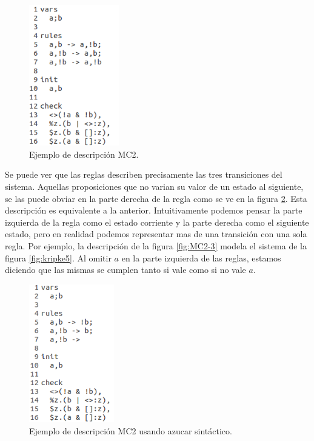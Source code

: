 \begin{figure}[H]
  \centering
  \includegraphics[width=0.35\textwidth]{Figures/modeloMC2-1.png}
  \caption{Ejemplo de descripción MC2.}
  \label{fig:MC2-1}
\end{figure}

Se puede ver que las reglas describen precisamente las tres transiciones del sistema. Aquellas proposiciones que no varian su valor de un estado al siguiente, se las puede obviar en la parte derecha de la regla como se ve en la figura \ref{fig:MC2-2}. Esta descripción es equivalente a la anterior. Intuitivamente podemos pensar la parte izquierda de la regla como el estado corriente y la parte derecha como el siguiente estado, pero en realidad podemos representar mas de una transición con una sola regla. Por ejemplo, la descripción de la figura \ref{fig:MC2-3} modela el sistema de la figura \ref{fig:kripke5}. Al omitir $a$ en la parte izquierda de las reglas, estamos diciendo que las mismas se cumplen tanto si vale como si no vale $a$.

\begin{figure}[H]
  \centering
  \includegraphics[width=0.33\textwidth]{Figures/modeloMC2-2.png}
  \caption{Ejemplo de descripción MC2 usando azucar sintáctico.}
  \label{fig:MC2-2}
\end{figure}

